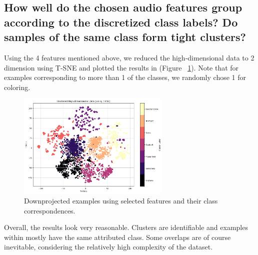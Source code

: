 \subsection{How well do the chosen audio features group according to the discretized class labels? Do samples of the same class form tight clusters?}
\label{sec:Labeling Function:c}
Using the 4 features mentioned above, we reduced the high-dimensional data to 2 dimension using T-SNE and plotted the results in (Figure ~\ref{fig:1_TSNE}). Note that for examples corresponding to more than 1 of the classes, we randomly chose 1 for coloring.

\begin{figure}[htbp]
    \centering
    \includegraphics[width=0.5\linewidth, height=5cm]{figs/1_TSNE.png}
    \caption{Downprojected examples using selected features and their class correspondences.}
    \label{fig:1_TSNE}
\end{figure}

Overall, the results look very reasonable. Clusters are identifiable and examples within mostly have the same attributed class. Some overlaps are of course inevitable, considering the relatively high complexity of the dataset. 